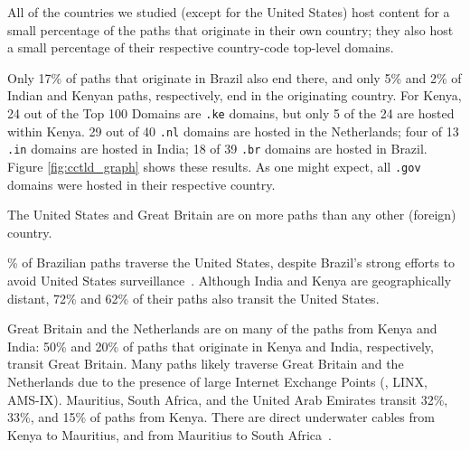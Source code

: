 

\begin{finding}
All of the countries we studied (except for the United States) host content for a small percentage of the paths that originate in their own country; they also host a small percentage of their respective country-code top-level domains.
\end{finding}
\noindent
Only 17\% of paths that originate in Brazil also end there, and only 5\%
and 2\% of Indian and Kenyan paths, respectively, end in the originating
country.  
For Kenya, 24 out of the Top 100 Domains are {\tt .ke} domains, but only 5
of the 24 are hosted within Kenya.  29 out of 40 {\tt .nl} domains are hosted in the Netherlands;
four of 13 {\tt .in} domains are hosted in India; 18 of 39 {\tt .br} domains are hosted in Brazil.  
Figure \ref{fig:cctld_graph} shows these results.  As one might expect, all {\tt .gov} domains were hosted in their respective country. 

\begin{finding}
The United States and Great Britain are on more paths than any other (foreign) country.
\end{finding}
\% of Brazilian paths traverse the United States, despite Brazil's
strong efforts to avoid United States surveillance~\cite{brazil_break_from_US,brazil_us_companies,brazil_conference,brazil_conference2,brazil_human_rights,brazil_cable}.  Although India and
Kenya are geographically distant, 72\% and 62\% of their paths also transit
the United States.

Great Britain and the Netherlands are on 
many of the paths from Kenya and India:
50\% and 20\% of
paths that originate in Kenya and India, respectively, transit Great
Britain.   Many paths likely traverse Great Britain and the Netherlands due to
the presence of large Internet Exchange Points (\ie, LINX, AMS-IX).
Mauritius, South Africa, and the United Arab Emirates transit 32\%,
33\%, and 15\% of paths from Kenya.  There are direct underwater cables
from Kenya to Mauritius, and from Mauritius to South
Africa~\cite{cablemap}.



